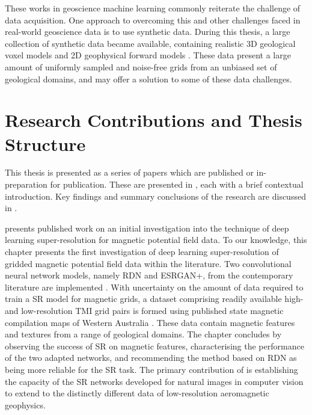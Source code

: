 These works in geoscience machine learning commonly reiterate the challenge of data acquisition.
One approach to overcoming this and other challenges faced in real-world geoscience data is to use synthetic data.
During this thesis, a large collection of synthetic data became available, containing realistic 3D geological voxel models and 2D geophysical forward models \parencite{jessellNoddyverseMassiveData2022}.
These data present a large amount of uniformly sampled and noise-free grids from an unbiased set of geological domains, and may offer a solution to some of these data challenges.

\section{Research Contributions and Thesis Structure}
This thesis is presented as a series of papers which are published or in-preparation for publication.
These are presented in , each with a brief contextual introduction.
Key findings and summary conclusions of the research are discussed in .

 presents published work on an initial investigation into the technique of deep learning super-resolution for magnetic potential field data.
To our knowledge, this chapter presents the first investigation of deep learning super-resolution of gridded magnetic potential field data within the literature.
Two convolutional neural network models, namely RDN and ESRGAN+, from the contemporary literature are implemented \parencite{zhangResidualDenseNetwork2018,limEnhancedDeepResidual2017}.
With uncertainty on the amount of data required to train a SR model for magnetic grids, a dataset comprising readily available high- and low-resolution TMI grid pairs is formed using published state magnetic compilation maps of Western Australia \parencite{brett20MagneticMerged2020}.
These data contain magnetic features and textures from a range of geological domains.
The chapter concludes by observing the success of SR on magnetic features, characterising the performance of the two adapted networks, and recommending the method based on RDN as being more reliable for the SR task.
The primary contribution of  is establishing the capacity of the SR networks developed for natural images in computer vision to extend to the distinctly different data of low-resolution aeromagnetic geophysics.

